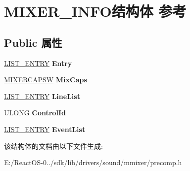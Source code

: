 \hypertarget{struct_m_i_x_e_r___i_n_f_o}{}\section{M\+I\+X\+E\+R\+\_\+\+I\+N\+F\+O结构体 参考}
\label{struct_m_i_x_e_r___i_n_f_o}
\subsection*{Public 属性}
\begin{DoxyCompactItemize}
\item 
\mbox{\label{struct_m_i_x_e_r___i_n_f_o_a765fa5226abb4a3b306b551aa71b8878}} 
\hyperlink{struct___l_i_s_t___e_n_t_r_y}{L\+I\+S\+T\+\_\+\+E\+N\+T\+RY} {\bfseries Entry}
\item 
\mbox{\label{struct_m_i_x_e_r___i_n_f_o_ae7df78ece66d8139cc799e2d2cabe27b}} 
\hyperlink{structtag_m_i_x_e_r_c_a_p_s_w}{M\+I\+X\+E\+R\+C\+A\+P\+SW} {\bfseries Mix\+Caps}
\item 
\mbox{\label{struct_m_i_x_e_r___i_n_f_o_a2eed29a7b18542ecfb15bf3e108246b6}} 
\hyperlink{struct___l_i_s_t___e_n_t_r_y}{L\+I\+S\+T\+\_\+\+E\+N\+T\+RY} {\bfseries Line\+List}
\item 
\mbox{\label{struct_m_i_x_e_r___i_n_f_o_a8feec780b7711d70ba05ca4e31f62b04}} 
U\+L\+O\+NG {\bfseries Control\+Id}
\item 
\mbox{\label{struct_m_i_x_e_r___i_n_f_o_aaaae01b401963691adb828cbc6eafe0b}} 
\hyperlink{struct___l_i_s_t___e_n_t_r_y}{L\+I\+S\+T\+\_\+\+E\+N\+T\+RY} {\bfseries Event\+List}
\end{DoxyCompactItemize}


该结构体的文档由以下文件生成\+:\begin{DoxyCompactItemize}
\item 
E\+:/\+React\+O\+S-\/0../sdk/lib/drivers/sound/mmixer/precomp.\+h\end{DoxyCompactItemize}
